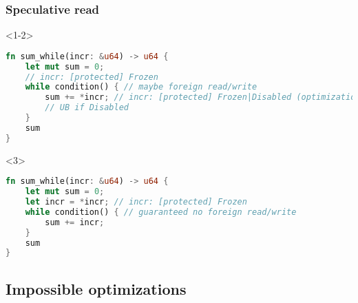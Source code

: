 \begin{frame}[fragile, t]
    \frametitle{{\cmark} Speculative read}
    \begin{onlyenv}<1-2>
        \begin{block}{}
            \begin{lstlisting}[language=rust]
fn sum_while(incr: &u64) -> u64 {
    let mut sum = 0;
    // incr: [protected] Frozen
    while condition() { // maybe foreign read/write
        sum += *incr; // incr: [protected] Frozen|Disabled (optimization: move up ?)
        // UB if Disabled
    }
    sum
}
            \end{lstlisting}
        \end{block}
    \end{onlyenv}

    \begin{onlyenv}<3>
        \begin{block}{}
            \begin{lstlisting}[language=rust]
fn sum_while(incr: &u64) -> u64 {
    let mut sum = 0;
    let incr = *incr; // incr: [protected] Frozen
    while condition() { // guaranteed no foreign read/write
        sum += incr;
    }
    sum
}
            \end{lstlisting}
        \end{block}
    \end{onlyenv}
\end{frame}

\subsection{Impossible optimizations}

